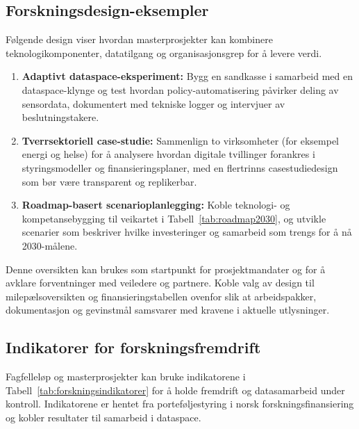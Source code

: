 \subsection{Forskningsdesign-eksempler}
Følgende design viser hvordan masterprosjekter kan kombinere teknologikomponenter, datatilgang og organisasjonsgrep for å levere verdi.
\begin{enumerate}
    \item \textbf{Adaptivt dataspace-eksperiment:} Bygg en sandkasse i samarbeid med en dataspace-klynge og test hvordan policy-automatisering påvirker deling av sensordata, dokumentert med tekniske logger og intervjuer av beslutningstakere.\citep{idsa2023ram,rcn2024programkatalog}
    \item \textbf{Tverrsektoriell case-studie:} Sammenlign to virksomheter (for eksempel energi og helse) for å analysere hvordan digitale tvillinger forankres i styringsmodeller og finansieringsplaner, med en flertrinns casestudiedesign som bør være transparent og replikerbar.\citep{yin2018case}
    \item \textbf{Roadmap-basert scenarioplanlegging:} Koble teknologi- og kompetansebygging til veikartet i Tabell~\ref{tab:roadmap2030}, og utvikle scenarier som beskriver hvilke investeringer og samarbeid som trengs for å nå 2030-målene.\citep{rcn2023veikart}
\end{enumerate}
Denne oversikten kan brukes som startpunkt for prosjektmandater og for å avklare forventninger med veiledere og partnere. Koble valg av design til milepælsoversikten og finansieringstabellen ovenfor slik at arbeidspakker, dokumentasjon og gevinstmål samsvarer med kravene i aktuelle utlysninger.\citep{rcn2024digitalisering}

\subsection*{Indikatorer for forskningsfremdrift}
Fagfelleløp og masterprosjekter kan bruke indikatorene i Tabell~\ref{tab:forskningsindikatorer} for å holde fremdrift og datasamarbeid under kontroll. Indikatorene er hentet fra porteføljestyring i norsk forskningsfinansiering og kobler resultater til samarbeid i dataspace.

